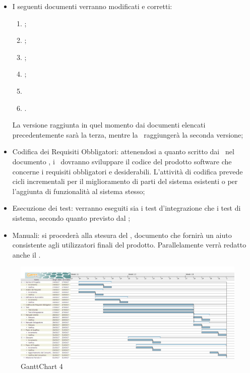 \documentclass[../PianoDiProgetto_v4.0.0.tex]{subfiles}
\begin{document}
	\begin{itemize}
		\item I seguenti documenti verranno modificati e corretti:
			\begin{enumerate}
				\item \normediprogetto;
				\item \analisideirequisiti;
				\item \pianodiqualifica;
				\item \pianodiprogetto;
				\item {}
				\item \glossario.
			\end{enumerate}
		La versione raggiunta in quel momento dai documenti elencati precedentemente sarà la terza, mentre la \ raggiungerà la seconda versione;
		\item Codifica dei Requisiti Obbligatori: attenendosi a quanto scritto dai \progettisti\ nel documento , i \programmatori\ dovranno sviluppare il codice del prodotto software che concerne i requisiti obbligatori e desiderabili. L'attività di codifica prevede cicli incrementali per il miglioramento di parti del sistema esistenti o per l'aggiunta di funzionalità al sistema stesso;
		\item Esecuzione dei test: verranno eseguiti sia i test d'integrazione che i test di sistema, secondo quanto previsto dal \pianodiqualifica;
		\item Manuali: si procederà alla stesura del \manualeutente, documento che fornirà un aiuto consistente agli utilizzatori finali del prodotto. Parallelamente verrà redatto anche il \manualesviluppatore.
	\end{itemize}	
		
	\begin{figure}[!h]
		\centering
		\includegraphics[width=\textwidth]{Pianificazione/Immagini/GanttChart04.png}
		\caption{GanttChart 4}
	\end{figure}	
	
\end{document}
